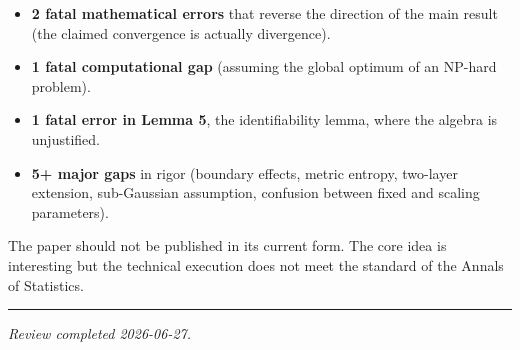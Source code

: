 \documentclass[
  12pt,
]{ctexart}
\providecommand{\tightlist}{%
  \setlength{\itemsep}{0pt}\setlength{\parskip}{0pt}}
\begin{document}
\begin{itemize}
\tightlist
\item
  \textbf{2 fatal mathematical errors} that reverse the direction of the
  main result (the claimed convergence is actually divergence).
\item
  \textbf{1 fatal computational gap} (assuming the global optimum of an
  NP-hard problem).
\item
  \textbf{1 fatal error in Lemma 5}, the identifiability lemma, where
  the algebra is unjustified.
\item
  \textbf{5+ major gaps} in rigor (boundary effects, metric entropy,
  two-layer extension, sub-Gaussian assumption, confusion between fixed
  and scaling parameters).
\end{itemize}

The paper should not be published in its current form. The core idea is
interesting but the technical execution does not meet the standard of
the Annals of Statistics.

\begin{center}\rule{0.5\linewidth}{0.5pt}\end{center}

\emph{Review completed 2026-06-27.}
\end{document}
